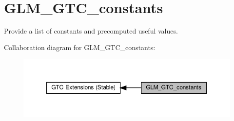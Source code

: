 \hypertarget{group__gtc__constants}{}\section{G\+L\+M\+\_\+\+G\+T\+C\+\_\+constants}
\label{group__gtc__constants}


Provide a list of constants and precomputed useful values.  


Collaboration diagram for G\+L\+M\+\_\+\+G\+T\+C\+\_\+constants\+:\nopagebreak
\begin{figure}[H]
\begin{center}
\leavevmode
\includegraphics[width=350pt]{group__gtc__constants}
\end{center}
\end{figure}
